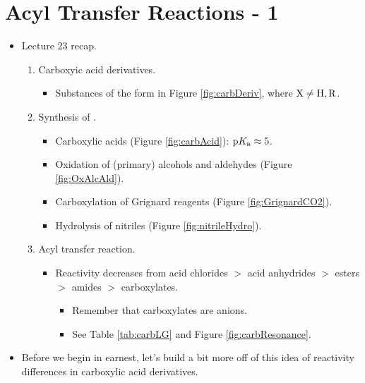 \documentclass[../notes.tex]{subfiles}
\begin{document}
\section{Acyl Transfer Reactions - 1}
\begin{itemize}
    \item {}Lecture 23 recap.
    \begin{enumerate}
        \item Carboxyic acid derivatives.
        \begin{itemize}
            \item Substances of the form in Figure \ref{fig:carbDeriv}, where $\ce{X}\neq\ce{H},\ce{R}$.
        \end{itemize}
        \item Synthesis of .
        \begin{itemize}
            \item Carboxylic acids (Figure \ref{fig:carbAcid}): $\textup{p}K_\textup{a}\approx 5$.
            \item Oxidation of (primary) alcohols and aldehydes (Figure \ref{fig:OxAlcAld}).
            \item Carboxylation of Grignard reagents (Figure \ref{fig:GrignardCO2}).
            \item Hydrolysis of nitriles (Figure \ref{fig:nitrileHydro}).
        \end{itemize}
        \item Acyl transfer reaction.
        \begin{itemize}
            \item Reactivity decreases from acid chlorides $>$ acid anhydrides $>$ esters $>$ amides $>$ carboxylates.
            \begin{itemize}
                \item Remember that carboxylates are anions.
                \item See Table \ref{tab:carbLG} and Figure \ref{fig:carbResonance}.
            \end{itemize}
        \end{itemize}
    \end{enumerate}
    \item Before we begin in earnest, let's build a bit more off of this idea of reactivity differences in carboxylic acid derivatives.
    \begin{figure}[h!]
        \centering
        \footnotesize
        \begin{subfigure}[b]{0.49\linewidth}

\end{subfigure}
\end{figure}
\end{itemize}
\end{document}
